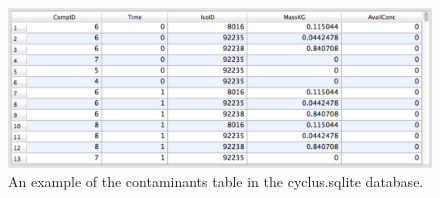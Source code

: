   \begin{figure}[htbp!]
    \begin{center}
      \includegraphics[width=\textwidth]{./chapters/paradigm/cont_table.eps}
      \caption[An example \Cyder output table of contaminant history.]{An example of the \Cyder contaminants table in the cyclus.sqlite database.}
      \label{fig:cont_table}
    \end{center}
  \end{figure}
